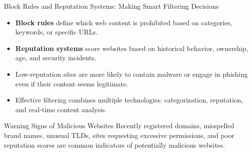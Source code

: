 \documentclass{beamer}
\begin{document}
            \begin{frame}{Block Rules and Reputation Systems: Making Smart Filtering Decisions}
            \begin{itemize}
                \item \textbf{Block rules} define which web content is prohibited based on categories, keywords, or specific URLs.
                \item \textbf{Reputation systems} score websites based on historical behavior, ownership, age, and security incidents.
                \item Low-reputation sites are more likely to contain malware or engage in phishing even if their content seems legitimate.
                \item Effective filtering combines multiple technologies: categorization, reputation, and real-time content analysis.
            \end{itemize}
            
            \begin{alertblock}{Warning Signs of Malicious Websites}
            Recently registered domains, misspelled brand names, unusual TLDs, sites requesting excessive permissions, and poor reputation scores are common indicators of potentially malicious websites.
            \end{alertblock}
            \end{frame}
            
\end{document}
